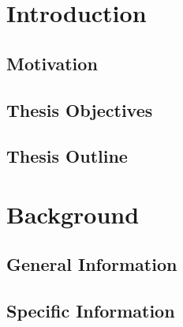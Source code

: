  \bodyoftext                   %

 \truedoublespacing            %
 

% 

\chapter{Introduction}\label{ch:Introduction}
  \lipsum[6-8]
  \section{Motivation}\label{sec:Motivation}
    \lipsum[1-3]
  \section{Thesis Objectives}\label{sec:thesisObjective}
    \lipsum[14-16]
  \section{Thesis Outline}\label{sec:thesisOutline}
    \lipsum[17]
                
\chapter{Background}\label{ch:Background}
  \section{General Information}\label{sec:}
    \lipsum[23-25]
  \section{Specific Information}\label{sec:}
    \lipsum[35-37]
